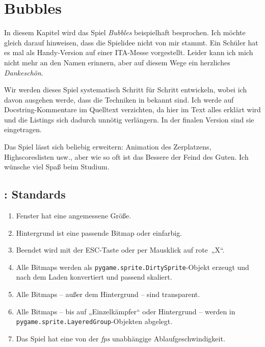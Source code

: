 \newpage
\section{Bubbles}

In diesem Kapitel wird das Spiel \emph{Bubbles} beispielhaft besprochen. Ich möchte gleich darauf hinweisen, dass die Spielidee nicht von mir stammt. Ein Schüler hat es mal als Handy-Version auf einer ITA-Messe vorgestellt. Leider kann ich mich nicht mehr an den Namen erinnern, aber auf diesem Wege ein herzliches \emph{Dankeschön}. 

Wir werden dieses Spiel systematisch Schritt für Schritt entwickeln, wobei ich davon ausgehen werde, dass die Techniken in  bekannt sind. Ich werde auf Docstring-Kommentare im Quelltext verzichten, da hier im Text alles erklärt wird und die Listings sich dadurch unnötig verlängern. In der finalen Version sind sie eingetragen.

Das Spiel lässt sich beliebig erweitern: Animation des Zerplatzens, Highscoreslisten usw., aber wie so oft ist das Bessere der Feind des Guten. Ich wünsche viel Spaß beim Studium.


\subsection{: Standards}

\begin{enumerate}
    \item Fenster hat eine angemessene Größe.\label{reqStandardGröße}
    \item Hintergrund ist eine passende Bitmap oder einfarbig.\label{reqStandardHintergrund}
    \item Beendet wird mit der ESC-Taste oder per Mausklick auf rote~„X“.\label{reqStandardBeenden}
    \item Alle Bitmaps werden als \texttt{pygame.sprite.DirtySprite}-Objekt erzeugt und nach dem Laden konvertiert und passend skaliert.\label{reqStandardSprite}
    \item Alle Bitmaps -- außer dem Hintergrund -- sind transparent.\label{reqStandardTransparenz}
    \item Alle Bitmaps -- bis auf „Einzelkämpfer“ oder Hintergrund -- werden in \texttt{pygame.sprite.LayeredGroup}-Objekten abgelegt.\label{reqStandardGruppe}
    \item Das Spiel hat eine von der \emph{fps} unabhängige Ablaufgeschwindigkeit.\label{reqStandardFps}
\end{enumerate}
\er


